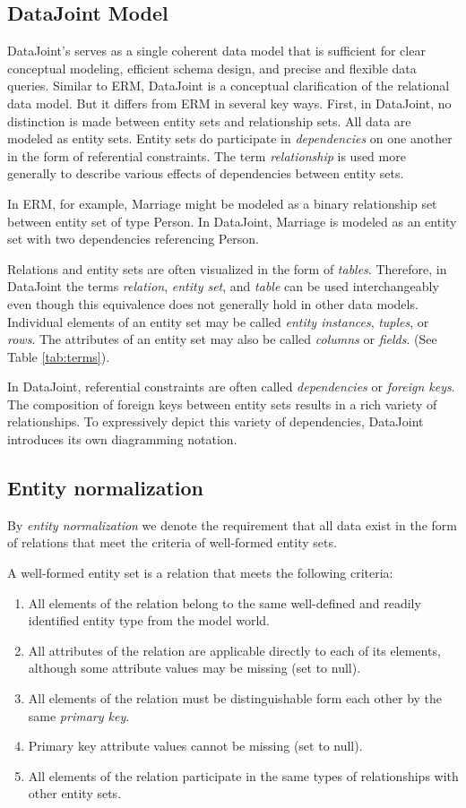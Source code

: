 \documentclass[letter,10pt]{article}
\newcommand{\datajoint}{DataJoint\xspace}
\begin{document}
\subsection{\datajoint Model}
\datajoint's serves as a single coherent data model that is sufficient for clear conceptual modeling, efficient schema design, and precise and flexible data queries. 
Similar to ERM, \datajoint is a conceptual clarification of the relational data model.  
But it differs from ERM in several key ways. 
First, in \datajoint, no distinction is made between entity sets and relationship sets.  All data are modeled as entity sets.
Entity sets do participate in \emph{dependencies} on one another in the form of referential constraints.  The term \emph{relationship} is used more generally to describe various  effects of dependencies between entity sets.

In ERM, for example, Marriage might be modeled as a binary relationship set between entity set of type Person.  In \datajoint, Marriage is modeled as an entity set with two dependencies referencing Person. 

Relations and entity sets are often visualized in the form of \emph{tables}. 
Therefore, in \datajoint the terms \emph{relation}, \emph{entity set}, and \emph{table} can be used interchangeably even though this equivalence does not generally hold in other data models. 
Individual elements of an entity set may be called \emph{entity instances}, \emph{tuples}, or \emph{rows}.
The attributes of an entity set may also be called \emph{columns} or \emph{fields}. (See Table \ref{tab:terms}).

In \datajoint, referential constraints are often called \emph{dependencies} or \emph{foreign keys}.  
The composition of foreign keys between entity sets results in a rich variety of relationships. 
To expressively depict this variety of dependencies, \datajoint introduces its own diagramming notation.


\subsection{Entity normalization}\label{sec:norm}
By \emph{entity normalization} we denote the requirement that all data exist in the form of relations that meet the criteria of well-formed entity sets.

A well-formed entity set is a relation that meets the following criteria:
\begin{enumerate}
\item All elements of the relation belong to the same well-defined and readily identified entity type from the model world.
\item All attributes of the relation are applicable directly to each of its elements, although some attribute values may be missing (set to null).  
\item All elements of the relation must be distinguishable form each other by the same \emph{primary key}.
\item Primary key attribute values cannot be missing (set to null).
\item All elements of the relation participate in the same types of relationships with other entity sets.
\end{enumerate}
\end{document}
